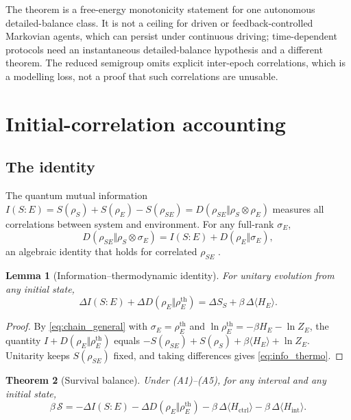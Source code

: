 \documentclass[12pt]{article}
\newtheorem{theorem}{Theorem}
\newtheorem{lemma}[theorem]{Lemma}
\begin{document}
The theorem is a free-energy monotonicity statement for one autonomous detailed-balance class. It is not a ceiling for driven or feedback-controlled Markovian agents, which can persist under continuous driving; time-dependent protocols need an instantaneous detailed-balance hypothesis and a different theorem. The reduced semigroup omits explicit inter-epoch correlations, which is a modelling loss, not a proof that such correlations are unusable.

\section{Initial-correlation accounting}
\label{sec:advantage}

\subsection{The identity}

The quantum mutual information $I(S{:}E)=S(\rho_S)+S(\rho_E)-S(\rho_{SE})=D(\rho_{SE}\Vert\rho_S\otimes\rho_E)$ measures all correlations between system and environment. For any full-rank $\sigma_E$,
\begin{equation}
\label{eq:chain_general}
D(\rho_{SE}\Vert\rho_S\otimes\sigma_E)=I(S{:}E)+D(\rho_E\Vert\sigma_E),
\end{equation}
an algebraic identity that holds for correlated $\rho_{SE}$ \cite{Wilde2017}.

\begin{lemma}[Information--thermodynamic identity]
\label{lem:info_thermo}
For unitary evolution from any initial state,
\begin{equation}
\label{eq:info_thermo}
\Delta I(S{:}E)+\Delta D(\rho_E\Vert\rho_E^{\mathrm{th}})=\Delta S_S+\beta\,\Delta\langle H_E\rangle .
\end{equation}
\end{lemma}

\begin{proof}
By \eqref{eq:chain_general} with $\sigma_E=\rho_E^{\mathrm{th}}$ and $\ln\rho_E^{\mathrm{th}}=-\beta H_E-\ln Z_E$, the quantity $I+D(\rho_E\Vert\rho_E^{\mathrm{th}})$ equals $-S(\rho_{SE})+S(\rho_S)+\beta\langle H_E\rangle+\ln Z_E$. Unitarity keeps $S(\rho_{SE})$ fixed, and taking differences gives \eqref{eq:info_thermo}.
\end{proof}

\begin{theorem}[Survival balance]
\label{thm:advantage}
Under \textup{(A1)--(A5)}, for any interval and any initial state,
\begin{equation}
\label{eq:advantage}
\boxed{\;
\beta\,\mathcal S=-\Delta I(S{:}E)-\Delta D(\rho_E\Vert\rho_E^{\mathrm{th}})
-\beta\,\Delta\langle H_{\mathrm{ctrl}}\rangle-\beta\,\Delta\langle H_{\mathrm{int}}\rangle .\;}
\end{equation}
\end{theorem}
\end{document}
